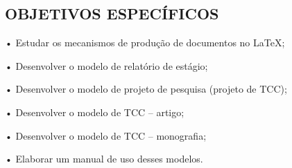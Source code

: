 \subsection{OBJETIVOS ESPECÍFICOS}
•	Estudar os mecanismos de produção de documentos no LaTeX;

•	Desenvolver o modelo de relatório de estágio;

•	Desenvolver o modelo de projeto de pesquisa (projeto de TCC);

•	Desenvolver o modelo de TCC – artigo;

•	Desenvolver o modelo de TCC – monografia;

•	Elaborar um manual de uso desses modelos.